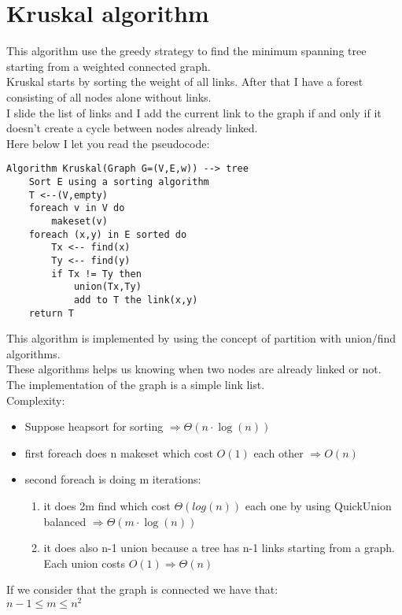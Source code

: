 \documentclass{article}
\begin{document}
\section{Kruskal algorithm}
This algorithm use the greedy strategy to find the minimum spanning tree starting from a weighted connected graph.\\
Kruskal starts by sorting the weight of all links. After that I have a forest consisting of all nodes alone without links.\\
I slide the list of links and I add the current link to the graph if and only if it doesn't create a cycle between nodes already linked.\\
Here below I let you read the pseudocode:\\
\begin{lstlisting}[caption={\\\textit{Kruskal algorithm.}}]
Algorithm Kruskal(Graph G=(V,E,w)) --> tree
	Sort E using a sorting algorithm
	T <--(V,empty)
	foreach v in V do
		makeset(v)
	foreach (x,y) in E sorted do
		Tx <-- find(x)
		Ty <-- find(y)
		if Tx != Ty then
			union(Tx,Ty)
			add to T the link(x,y)
	return T
\end{lstlisting}
This algorithm is implemented by using the concept of partition with union/find algorithms.\\
These algorithms helps us knowing when two nodes are already linked or not.\\
The implementation of the graph is a simple link list.\\
Complexity:\\
\begin{itemize}
\item Suppose heapsort for sorting $\Rightarrow \Theta(n\cdot \log(n))$
\item first foreach does n makeset which cost $O(1)$ each other $\Rightarrow O(n)$
\item second foreach is doing m iterations:
\begin{enumerate}
\item it does 2m find which cost $\Theta(log(n))$ each one by using QuickUnion balanced $\Rightarrow \Theta(m\cdot \log(n))$
\item it does also n-1 union because a tree has n-1 links starting from a graph. Each union costs $O(1) \Rightarrow \Theta(n)$ 
\end{enumerate}
\end{itemize}
If we consider that the graph is connected we have that:\\
$n-1 \leq m \leq n^2$
\end{document}
